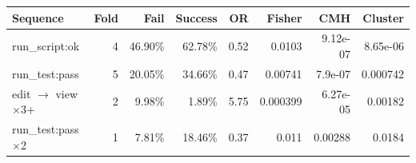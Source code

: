 \begin{tabular}{lrrrrrrr}
\toprule
Sequence & Fold & Fail & Success & OR & Fisher & CMH & Cluster \\
\midrule
run\_script:ok & 4 & 46.90\% & 62.78\% & 0.52 & 0.0103 & 9.12e-07 & 8.65e-06 \\
run\_test:pass & 5 & 20.05\% & 34.66\% & 0.47 & 0.00741 & 7.9e-07 & 0.000742 \\
edit $\to$ view$\times$3+ & 2 & 9.98\% & 1.89\% & 5.75 & 0.000399 & 6.27e-05 & 0.00182 \\
run\_test:pass$\times$2 & 1 & 7.81\% & 18.46\% & 0.37 & 0.011 & 0.00288 & 0.0184 \\
\bottomrule
\end{tabular}
